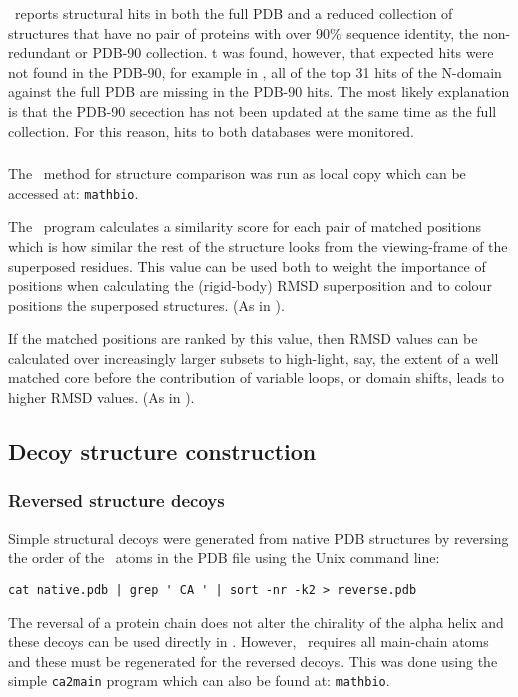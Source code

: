 \DALI\ reports structural hits in both the full PDB and a reduced collection of structures that
have no pair of proteins with over 90\% sequence identity, the non-redundant or PDB-90 collection.
t was found, however, that expected hits were not found in the PDB-90, for example in ,
all of the top 31 hits of the N-domain against the full PDB are missing in the PDB-90 hits.
The most likely explanation is that the PDB-90 secection has not been updated at the same time
as the full collection.    For this reason, hits to both databases were monitored.

\subsubsection{\SAP}

The \SAP\ method for structure comparison \cite{TaylorWR99a} was run as local copy which can
be accessed at: {\tt mathbio}.

The \SAP\ program calculates a similarity score for each pair of matched positions which is
how similar the rest of the structure looks from the viewing-frame of the superposed residues.
This value can be used both to weight the importance of positions when calculating the
(rigid-body) RMSD superposition and to colour positions the superposed structures.
(As in \Fig{}).

If the matched positions are ranked by this value, then RMSD values can be calculated over
increasingly larger subsets to high-light, say, the extent of a well matched core before
the contribution of variable loops, or domain shifts, leads to higher RMSD values.
(As in ).

\subsection{Decoy structure construction}

\subsubsection{Reversed structure decoys}

Simple structural decoys were generated from native PDB structures by reversing the order
of the \CA\ atoms in the PDB file using the Unix command line:
\begin{verbatim}
cat native.pdb | grep ' CA ' | sort -nr -k2 > reverse.pdb
\end{verbatim}
The reversal of a protein chain does not alter the chirality of the alpha helix and
these decoys can be used directly in \SAP.   However, \DALI\ requires all main-chain atoms
and these must be regenerated for the reversed decoys.   This was done using the simple
{\tt ca2main} program which can also be found at: {\tt  mathbio}.

